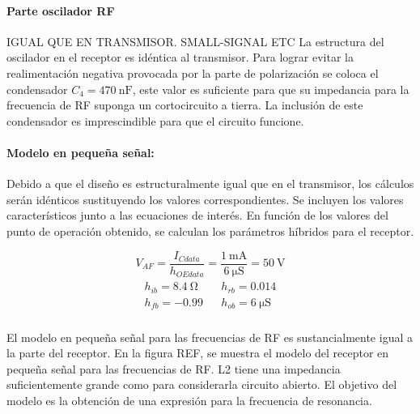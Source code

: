 \paragraph{Parte oscilador RF} IGUAL QUE EN TRANSMISOR. SMALL-SIGNAL ETC 
La estructura del oscilador en el receptor es idéntica al transmisor. Para lograr evitar la realimentación negativa provocada por la parte de polarización se coloca el condensador $C_4 = \SI{470}{\nano\farad}$, este valor es suficiente para que su impedancia para la frecuencia de RF suponga un cortocircuito a tierra. La inclusión de este condensador es imprescindible para que el circuito funcione. 
\paragraph{Modelo en pequeña señal:} Debido a que el diseño es estructuralmente igual que en el transmisor, los cálculos serán idénticos sustituyendo los valores correspondientes.
Se incluyen los valores característicos junto a las ecuaciones de interés.
En función de los valores del punto de operación obtenido, se calculan los parámetros híbridos para el receptor.

\begin{equation}
   \label{eq:result_pol1}
V_{AF} = \frac{I_{Cdata}}{h_{OEdata}} =\frac{\SI{1}{\milli\ampere}}{\SI{6}{\micro\siemens}} =  \SI{50}{\volt} 
\end{equation}
\begin{equation}
   \label{eq:result_pol2}
\begin{array}{rl} 
      \begin{array}{l}
	 h_{ib} =  \SI{8.4}{\ohm} \\
	 h_{fb} =  -0.99
      \end{array}
      &
      \begin{array}{l}
	 h_{rb} =  0.014 \\
	 h_{ob} =  \SI{6}{\micro\siemens}
      \end{array}
\end{array}
\end{equation}

\paragraph{}
El modelo en pequeña señal para las frecuencias de RF es sustancialmente igual a la parte del receptor. En la figura REF, se muestra el modelo del receptor en pequeña señal para las frecuencias de RF. L2 tiene una impedancia suficientemente grande como para considerarla circuito abierto. El objetivo del modelo es la obtención de una expresión para la frecuencia de resonancia.

